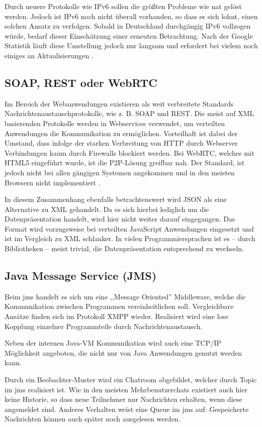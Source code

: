 \documentclass[oneside, ngerman, toc=bibliography,bibliography=totoc,listof=entryprefix, open=right,numbers=noenddot,fontsize=12pt]{scrbook}
\begin{document}
Durch neuere Protokolle wie IPv6 sollen die größten Probleme wie \acrshort{nat} gelöst werden.
Jedoch ist IPv6 noch nicht überall vorhanden, so dass es sich lohnt, einen solchen Ansatz zu verfolgen.
Sobald in Deutschland durchgängig IPv6 vollzogen würde, bedarf dieser Einschätzung einer erneuten Betrachtung. Nach der Google Statistik läuft diese Umstellung jedoch nur langsam und erfordert bei vielem noch einiges an Aktualisierungen \cite{gstat}. 


\subsection{SOAP, REST oder WebRTC}
Im Bereich der Webanwendungen existieren als weit verbreitete Standards Nachrichtenaustauschprotokolle, wie z. B. {SOAP} und {REST}.
Die meist auf {XML} basierenden Protokolle werden in Webservices verwendet, um verteilten Anwendungen die Kommunikation zu ermöglichen.
Vorteilhaft ist dabei der Umstand, dass infolge der starken Verbreitung von {HTTP} durch Webserver Verbindungen kaum durch Firewalls blockiert werden. 
Bei {WebRTC}, welches mit {HTML5} eingeführt wurde, ist die P2P-Lösung greifbar nah. Der Standard, ist jedoch nicht bei allen gängigen Systemen angekommen und in den meisten Browsern nicht implementiert \cite{cani}.

In diesem Zusammenhang ebenfalls betrachtenswert wird {JSON} als eine Alternative zu {XML} gehandelt. Da es sich hierbei lediglich um die Datenpräsentation handelt, wird hier nicht weiter darauf eingegangen. Das Format wird vorzugsweise bei verteilten JavaScript Anwendungen eingesetzt und ist im Vergleich zu {XML} schlanker. In vielen Programmiersprachen ist es -- durch Bibliotheken -- meist trivial, die Datenpräsentation entsprechend zu wechseln.


\subsection{Java Message Service (JMS)}
\label{chap:jms}
Beim \acrfull{jms} handelt es sich um eine ,,Message Oriented'' Middleware, welche die Kommunikation zwischen Programmen vereinheitlichen soll. Vergleichbare Ansätze finden sich im Protokoll XMPP wieder. Realisiert wird eine lose Kopplung einzelner Programmteile durch Nachrichtenaustausch.

Neben der internen Java-VM Kommunikation wird auch eine {TCP/IP} Möglichkeit angeboten, die nicht nur von Java Anwendungen genutzt werden kann.

Durch ein Beobachter-Muster  wird ein Chatroom abgebildet, welcher durch Topic im  \acrshort{jms} realisiert ist.
Wie in den meisten Mehrbenutzerchats existiert auch hier keine Historie, so dass neue Teilnehmer nur Nachrichten erhalten, wenn diese angemeldet sind.
Anderes Verhalten weist eine Queue im \acrshort{jms} auf: Gespeicherte Nachrichten können auch später noch ausgelesen werden.
\end{document}
